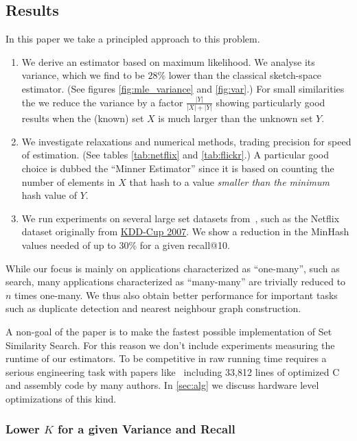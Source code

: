 \subsection{Results}

In this paper we take a principled approach to this problem.
\begin{enumerate}
   \item We derive an estimator based on maximum likelihood.
      We analyse its variance, which we find to be $28\%$ lower than the classical sketch-space estimator.
      (See figures \ref{fig:mle_variance} and \ref{fig:var}.)
      For small similarities the we reduce the variance by a factor $\frac{|Y|}{|X|+|Y|}$ showing particularly good results when the (known) set $X$ is much larger than the unknown set $Y$.
   \item We investigate relaxations and numerical methods, trading precision for speed of estimation. (See tables \ref{tab:netflix} and \ref{tab:flickr}.)
      A particular good choice is dubbed the ``Minner Estimator'' since it is based on counting the number of elements in $X$ that hash to a value \emph{smaller than the minimum} hash value of $Y$.
   \item We run experiments on several large set datasets from~\cite{mann2016empirical},
      such as the Netflix dataset originally from \href{https://www.cs.uic.edu/~liub/Netflix-KDD-Cup-2007.html}{KDD-Cup 2007}.
      We show a reduction in the MinHash values needed of up to 30\% for a given recall@10.
\end{enumerate}

While our focus is mainly on applications characterized as ``one-many'', such as search, many applications characterized as ``many-many'' are trivially reduced to $n$ times one-many.
We thus also obtain better performance for important tasks such as duplicate detection and nearest neighbour graph construction.

A non-goal of the paper is to make the fastest possible implementation of Set Similarity Search.
For this reason we don't include experiments measuring the runtime of our estimators.
To be competitive in raw running time requires a serious engineering task with papers like~\cite{guo2020accelerating} including 33,812 lines of optimized C and assembly code by many authors.
In \cref{sec:alg} we discuss hardware level optimizations of this kind.

\subsubsection{Lower $K$ for a given Variance and Recall}

